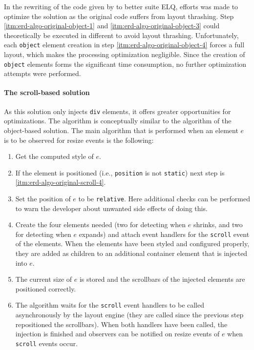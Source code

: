 \documentclass[a4paper,11pt]{kth-mag}
\newcommand{\code}[1]{\texttt{#1}}
\begin{document}
        In the rewriting of the code given by \cite{backalley} to better suite \gls{ELQ}, efforts was made to optimize the solution as the original code suffers from \gls{layout thrashing}.
        Step \ref{itm:erd-algo-original-object-1} and \ref{itm:erd-algo-original-object-3} could theoretically be executed in different  to avoid \gls{layout thrashing}.
        Unfortunately, each \code{object} element creation in step \ref{itm:erd-algo-original-object-4} forces a full layout, which makes the  processing optimization negligible.
        Since the creation of \code{object} \glspl{element} forms the significant time consumption, no further optimization attempts were performed.

        \paragraph{The scroll-based solution}
        As this solution only injects \code{div} \glspl{element}, it offers greater opportunities for optimizations.
        The algorithm is conceptually similar to the algorithm of the object-based solution.
        The main algorithm that is performed when an element $e$ is to be observed for resize events is the following:
        \begin{enumerate}
          \item\label{itm:erd-algo-original-scroll-1} Get the computed style of $e$.
          \item\label{itm:erd-algo-original-scroll-2} If the element is positioned (i.e., \code{position} is not \code{static}) next step is \ref{itm:erd-algo-original-scroll-4}.
          \item\label{itm:erd-algo-original-scroll-3} Set the position of $e$ to be \code{relative}. Here additional checks can be performed to warn the developer about unwanted side effects of doing this.
          \item\label{itm:erd-algo-original-scroll-4} Create the four \glspl{element} needed (two for detecting when $e$ shrinks, and two for detecting when $e$ expands) and attach event handlers for the \code{scroll} event of the \glspl{element}.
                                                      When the \glspl{element} have been styled and configured properly, they are added as children to an additional container element that is injected into $e$.
          \item\label{itm:erd-algo-original-scroll-5} The current size of $e$ is stored and the scrollbars of the injected \glspl{element} are positioned correctly.
          \item\label{itm:erd-algo-original-scroll-6} The algorithm waits for the \code{scroll} event handlers to be called asynchronously by the \gls{layout engine} (they are called since the previous step repositioned the scrollbars).
                                                      When both handlers have been called, the injection is finished and observers can be notified on resize events of $e$ when \code{scroll} events occur.
        \end{enumerate}
\end{document}
